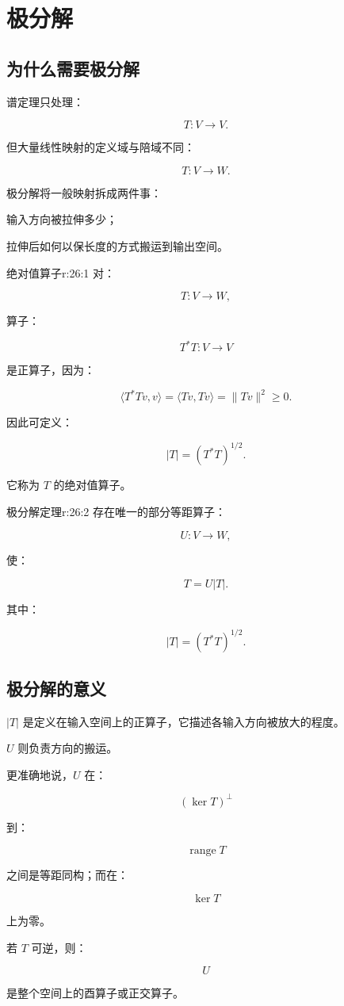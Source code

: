 
\chapter{极分解}


\section{为什么需要极分解}

谱定理只处理：

\[
T:V\to V.
\]

但大量线性映射的定义域与陪域不同：

\[
T:V\to W.
\]

极分解将一般映射拆成两件事：

\begin{jitem}
\item %
输入方向被拉伸多少；
\item %
拉伸后如何以保长度的方式搬运到输出空间。
\end{jitem}

\begin{jdefn}{绝对值算子}{r:26:1}
对：

\[
T:V\to W,
\]

算子：

\[
T^*T:V\to V
\]

是正算子，因为：

\[
\langle T^*Tv,v\rangle
=
\langle Tv,Tv\rangle
=
\|Tv\|^2
\ge0.
\]

因此可定义：

\[
|T|
=
(T^*T)^{1/2}.
\]

它称为 $T$ 的绝对值算子。
\end{jdefn}

\begin{jthm}{极分解定理}{r:26:2}
存在唯一的部分等距算子：

\[
U:V\to W,
\]

使：

\[
T=U|T|.
\]

其中：

\[
|T|=(T^*T)^{1/2}.
\]
\end{jthm}

\section{极分解的意义}

$|T|$ 是定义在输入空间上的正算子，它描述各输入方向被放大的程度。

$U$ 则负责方向的搬运。

更准确地说，$U$ 在：

\[
(\ker T)^\perp
\]

到：

\[
\operatorname{range}T
\]

之间是等距同构；而在：

\[
\ker T
\]

上为零。

若 $T$ 可逆，则：

\[
U
\]

是整个空间上的酉算子或正交算子。
